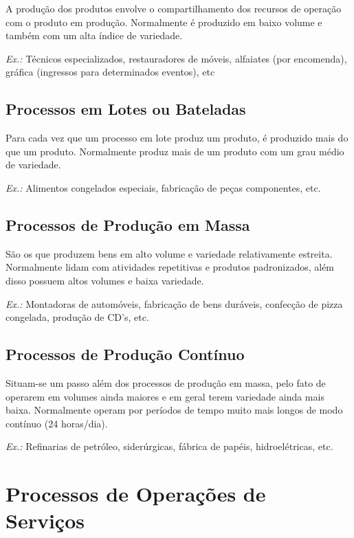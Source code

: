 				A produção dos produtos envolve o compartilhamento dos recursos de operação com o produto em produção. Normalmente é produzido em baixo volume e também com um alta índice de variedade.
				
				\emph{Ex.:} Técnicos especializados, restauradores de móveis, alfaiates (por encomenda), gráfica (ingressos para determinados eventos), etc

			\subsection[Processos em Lotes ou Bateladas]{Processos em Lotes ou Bateladas}
			\label{sec:processos_manufatura_lotes}

				Para cada vez que um processo em lote produz um produto, é produzido mais do que um produto. Normalmente produz mais de um produto com um grau médio de variedade.
				
				\emph{Ex.:} Alimentos congelados especiais, fabricação de peças componentes, etc.

			\subsection[Processos de Produção em Massa]{Processos de Produção em Massa}
			\label{sec:processos_manufatura_massa}

				São os que produzem bens em alto volume e variedade relativamente estreita. Normalmente lidam com atividades repetitivas e produtos padronizados, além disso possuem altos volumes e baixa variedade.
				
				\emph{Ex.:} Montadoras de automóveis, fabricação de bens duráveis, confecção de pizza congelada, produção de CD’s, etc.

			\subsection[Processos de Produção Contínuo]{Processos de Produção Contínuo}
			\label{sec:processos_manufatura_continuo}

				Situam-se um passo além dos processos de produção em massa, pelo fato de operarem em volumes ainda maiores e em geral terem variedade ainda mais baixa. Normalmente operam por períodos de tempo muito mais longos de modo contínuo (24 horas/dia).
				
				\emph{Ex.:} Refinarias de petróleo, siderúrgicas, fábrica de papéis, hidroelétricas, etc.

		\section[Processos de Operações de Serviços]{Processos de Operações de Serviços}
		\label{sec:processos_servico}


